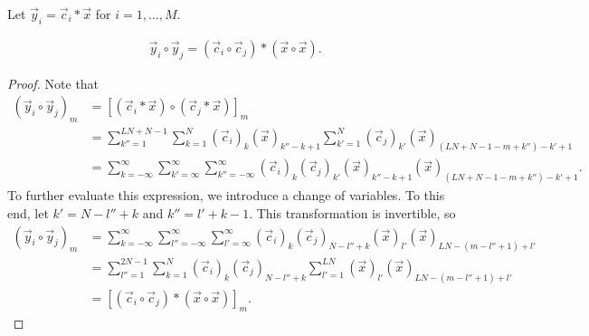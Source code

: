 \documentclass[a4paper, openany, oneside]{memoir}
\begin{document}
Let $\vec{y}_i = \vec{c}_i \ast \vec{x}$ for $i = 1,\ldots,M$.

\begin{theorem}
    \begin{align*}
        \vec{y}_i \circ \vec{y}_j = (\vec{c}_i \circ \vec{c}_j) \ast (\vec{x} \circ \vec{x}).
    \end{align*}
\end{theorem}
\begin{proof}
    Note that
    \begin{align*}
        (\vec{y}_i \circ \vec{y}_j)_m
        &= [(\vec{c}_i \ast \vec{x}) \circ (\vec{c}_j \ast \vec{x})]_m \\
        &=\sum_{k''=1}^{LN+N-1}\sum_{k=1}^N (\vec{c}_i)_k (\vec{x})_{k''-k+1}\sum_{k'=1}^{N}(\vec{c}_j)_{k'}(\vec{x})_{(LN+N-1-m+k'')-k'+1} \\
        &=\sum_{k=-\infty}^\infty\sum_{k'=\infty}^{\infty}\sum_{k''=-\infty}^{\infty} (\vec{c}_i)_k (\vec{c}_j)_{k'}(\vec{x})_{k''-k+1}(\vec{x})_{(LN+N-1-m+k'')-k'+1}.
    \end{align*}
    To further evaluate this expression, we introduce a change of variables. To this end, let $k' = N -l'' +k$ and $k'' = l' + k - 1$. This transformation is invertible, so
    \begin{align*}
        (\vec{y}_i \circ \vec{y}_j)_m
        &=\sum_{k=-\infty}^\infty\sum_{l''=-\infty}^{\infty}\sum_{l'=\infty}^{\infty} (\vec{c}_i)_k (\vec{c}_j)_{N -l'' +k}(\vec{x})_{l'}
        (\vec{x})_{LN-(m-l'' + 1)+l'} \\
        &=\sum_{l''=1}^{2N-1}\sum_{k=1}^{N}(\vec{c}_i)_k (\vec{c}_j)_{N -l'' +k}\sum_{l'=1}^{LN}(\vec{x})_{l'}
        (\vec{x})_{LN-(m-l'' + 1)+l'} \\
        &=[(\vec{c}_i \circ \vec{c}_j) \ast (\vec{x} \circ \vec{x})]_m.
    \end{align*}
\end{proof}
\end{document}
